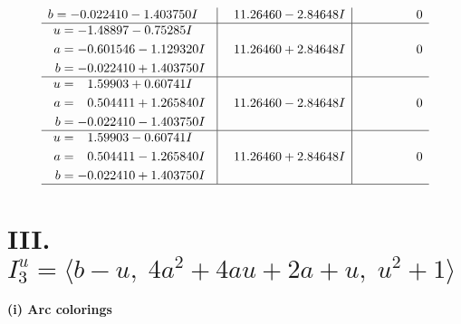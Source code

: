 \documentclass[1p]{elsarticle_modified}
\theoremstyle{definition}
\begin{document}
$$\begin{array}{c|c|c}
\begin{aligned}
b &= -0.022410 - 1.403750 I\end{aligned}
 & \phantom{-}11.26460 - 2.84648 I & \phantom{-0.000000 } 0 \\ \hline\begin{aligned}
u &= -1.48897 - 0.75285 I \\
a &= -0.601546 - 1.129320 I \\
b &= -0.022410 + 1.403750 I\end{aligned}
 & \phantom{-}11.26460 + 2.84648 I & \phantom{-0.000000 } 0 \\ \hline\begin{aligned}
u &= \phantom{-}1.59903 + 0.60741 I \\
a &= \phantom{-}0.504411 + 1.265840 I \\
b &= -0.022410 - 1.403750 I\end{aligned}
 & \phantom{-}11.26460 - 2.84648 I & \phantom{-0.000000 } 0 \\ \hline\begin{aligned}
u &= \phantom{-}1.59903 - 0.60741 I \\
a &= \phantom{-}0.504411 - 1.265840 I \\
b &= -0.022410 + 1.403750 I\end{aligned}
 & \phantom{-}11.26460 + 2.84648 I & \phantom{-0.000000 } 0\\
 \hline 
 \end{array}$$\newpage\newpage\renewcommand{\arraystretch}{1}
\centering \section*{III. $I^u_{3}= \langle b- u,\;4 a^2+4 a u+2 a+u,\;u^2+1 \rangle$}
\flushleft \textbf{(i) Arc colorings}\\
\end{document}
